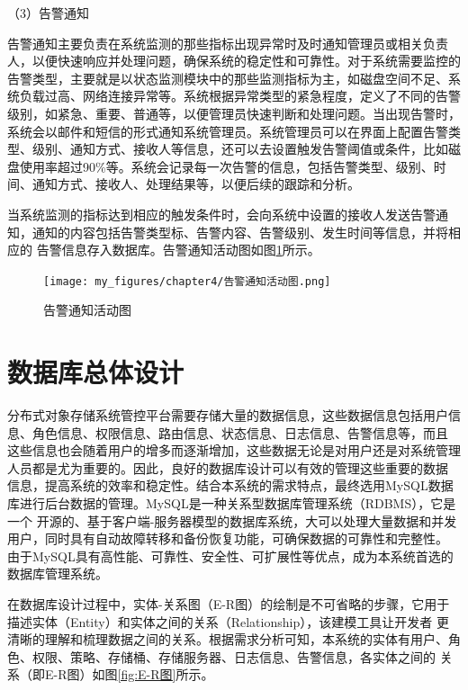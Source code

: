 （3）告警通知

告警通知主要负责在系统监测的那些指标出现异常时及时通知管理员或相关负责人，以便快速响应并处理问题，确保系统的稳定性和可靠性。对于系统需要监控的
告警类型，主要就是以状态监测模块中的那些监测指标为主，如磁盘空间不足、系统负载过高、网络连接异常等。系统根据异常类型的紧急程度，定义了不同的告警
级别，如紧急、重要、普通等，以便管理员快速判断和处理问题。当出现告警时，系统会以邮件和短信的形式通知系统管理员\cite{kngqineji}。系统管理员可以在界面上配置告警类
型、级别、通知方式、接收人等信息，还可以去设置触发告警阈值或条件，比如磁盘使用率超过90\%等。系统会记录每一次告警的信息，包括告警类型、级别、时
间、通知方式、接收人、处理结果等，以便后续的跟踪和分析。

当系统监测的指标达到相应的触发条件时，会向系统中设置的接收人发送告警通知，通知的内容包括告警类型标、告警内容、告警级别、发生时间等信息，并将相应的
告警信息存入数据库。告警通知活动图如图\ref{fig:告警通知活动图}所示。

\begin{figure}[htb]
    \centering
    \texttt{[image: my\_figures/chapter4/告警通知活动图.png]}
    \caption{告警通知活动图}
    \label{fig:告警通知活动图}
\end{figure}


\section{数据库总体设计}

分布式对象存储系统管控平台需要存储大量的数据信息，这些数据信息包括用户信息、角色信息、权限信息、路由信息、状态信息、日志信息、告警信息等，而且
这些信息也会随着用户的增多而逐渐增加，这些数据无论是对用户还是对系统管理人员都是尤为重要的。因此，良好的数据库设计可以有效的管理这些重要的数据
信息，提高系统的效率和稳定性。结合本系统的需求特点，最终选用MySQL数据库进行后台数据的管理。MySQL是一种关系型数据库管理系统（RDBMS），它是一个
开源的、基于客户端-服务器模型的数据库系统\cite{kn2e2i}，大可以处理大量数据和并发用户，同时具有自动故障转移和备份恢复功能，可确保数据的可靠性和完整性。
由于MySQL具有高性能、可靠性、安全性、可扩展性等优点，成为本系统首选的数据库管理系统。


在数据库设计过程中，实体-关系图（E-R图）的绘制是不可省略的步骤，它用于描述实体（Entity）和实体之间的关系（Relationship）\cite{kng2eji}，该建模工具让开发者
更清晰的理解和梳理数据之间的关系。根据需求分析可知，本系统的实体有用户、角色、权限、策略、存储桶、存储服务器、日志信息、告警信息，各实体之间的
关系（即E-R图）如图\ref{fig:E-R图}所示。

